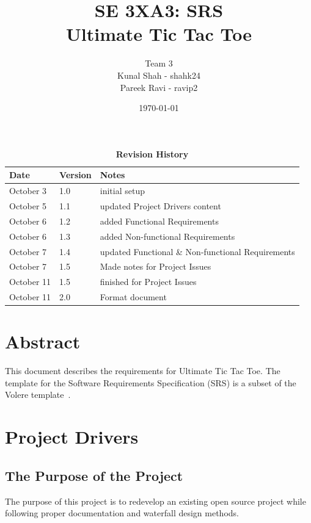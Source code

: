 \documentclass[12pt, titlepage]{article}
\title{SE 3XA3: SRS\\Ultimate Tic Tac Toe}
\author{Team 3
		\\ Kunal Shah - shahk24
		\\ Pareek Ravi - ravip2
}
\date{\today}
\begin{document}
\maketitle

\tableofcontents
\listoftables
\listoffigures

\newpage

\begin{table}[hp]
\caption{\bf Revision History}
\begin{tabularx}{\textwidth}{p{3cm}p{2cm}X}
\toprule {\bf Date} & {\bf Version} & {\bf Notes}\\
\midrule
October 3 & 1.0 & initial setup\\
October 5 & 1.1 & updated Project Drivers content\\
October 6 & 1.2 & added Functional Requirements\\
October 6 & 1.3 & added Non-functional Requirements\\
October 7 & 1.4 & updated Functional \& Non-functional Requirements\\
October 7 & 1.5 & Made notes for Project Issues\\
October 11 & 1.5 & finished for Project Issues\\
October 11 & 2.0 & Format document\\
\bottomrule
\end{tabularx}
\end{table}

\newpage


\section*{Abstract}
This document describes the requirements for Ultimate Tic Tac Toe. The template 
for the Software Requirements Specification (SRS) is a subset of the Volere
template~\citep{RobertsonAndRobertson2012}.

\section{Project Drivers}

\subsection{The Purpose of the Project}
The purpose of this project is to redevelop an existing open source project
while following proper documentation and waterfall design methods.
\end{document}
